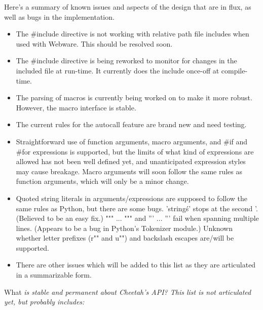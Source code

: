 Here's a summary of known issues and aspects of the design that are in flux,
as well as bugs in the implementation.

\begin{itemize}

\item The \#include directive is not working with relative path file includes
     when used with Webware. This should be resolved soon.

\item The \#include directive is being reworked to monitor for changes in the
     included file at run-time. It currently does the include once-off at
     compile-time.

\item The parsing of macros is currently being worked on to make it more
     robust.  However, the macro interface is stable.

\item The current rules for the autocall feature are brand new and need
     testing.

\item Straightforward use of function arguments, macro arguments, and
     \#if and \#for expressions is supported, but the limits of what kind of
     expressions are allowed has not been well defined yet, and unanticipated
     expression styles may cause breakage.  Macro arguments will soon follow
     the same rules as function arguments, which will only be a minor change.

\item Quoted string literals in arguments/expressions are supposed to follow
     the same rules as Python, but there are some bugs.  
     'string\'s' stops at the second '.  (Believed to be an easy fix.)
     """ ... """ and ''' ... ''' fail when spanning multiple lines.
     (Appears to be a bug in Python's Tokenizer module.)
     Unknown whether letter prefixes (r"" and u"") and backslash escapes
     are/will be supported.

\item There are other issues which will be added to this list as they are
     articulated in a summarizable form.

\end{itemize}

What \em{is} stable and permanent about Cheetah's API?  This list is not
articulated yet, but probably includes:

